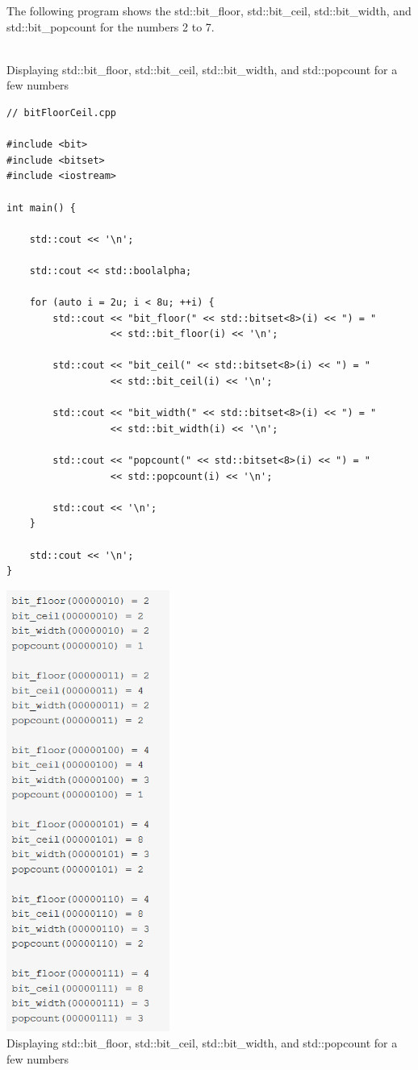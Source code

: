 The following program shows the std::bit\_floor, std::bit\_ceil, std::bit\_width, and std::bit\_popcount for the numbers 2 to 7.

\hspace*{\fill} \\ %
\noindent
Displaying std::bit\_floor, std::bit\_ceil, std::bit\_width, and std::popcount for a few numbers
\begin{lstlisting}[style=styleCXX]
// bitFloorCeil.cpp

#include <bit>
#include <bitset>
#include <iostream>

int main() {
	
	std::cout << '\n';
	
	std::cout << std::boolalpha;
	
	for (auto i = 2u; i < 8u; ++i) {
		std::cout << "bit_floor(" << std::bitset<8>(i) << ") = "
		          << std::bit_floor(i) << '\n';
		
		std::cout << "bit_ceil(" << std::bitset<8>(i) << ") = "
		          << std::bit_ceil(i) << '\n';
		
		std::cout << "bit_width(" << std::bitset<8>(i) << ") = "
		          << std::bit_width(i) << '\n';
		
		std::cout << "popcount(" << std::bitset<8>(i) << ") = "
		          << std::popcount(i) << '\n';
		
		std::cout << '\n';
	}

	std::cout << '\n';
}
\end{lstlisting}

\begin{center}
\includegraphics[width=0.4\textwidth]{content/3/chapter5/images/1-7.png}\\
Displaying std::bit\_floor, std::bit\_ceil, std::bit\_width, and std::popcount for a few numbers
\end{center}

